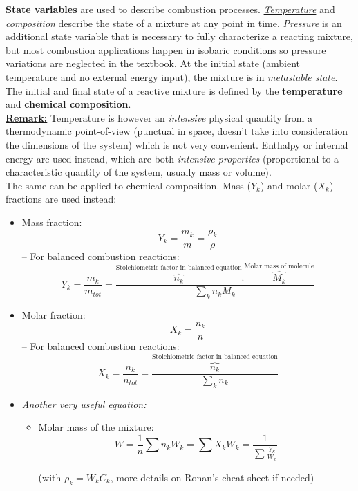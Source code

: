 \documentclass[a4paper,11pt]{article}
\begin{document}
\textbf{State variables} are used to describe combustion processes. \underline{\emph{Temperature}} and \underline{\emph{composition}} describe the state of a mixture at any point in time. \underline{\emph{Pressure}} is an additional state variable that is necessary to fully characterize a reacting mixture, but most combustion applications happen in isobaric conditions so pressure variations are neglected in the textbook.
At the initial state (ambient temperature and no external energy input), the mixture is in \emph{metastable state}. The initial and final state of a reactive mixture is defined by the \textbf{temperature} and \textbf{chemical composition}.
\vspace{4pt}
\\
\underline{\textbf{\small Remark:}} Temperature is however an \textit{intensive} physical quantity from a thermodynamic point-of-view (punctual in space, doesn't take into consideration the dimensions of the system) which is not very convenient. Enthalpy or internal energy are used instead, which are both \textit{intensive properties} (proportional to a characteristic quantity of the system, usually mass or volume).\\
The same can be applied to chemical composition. Mass ($Y_k$) and molar ($X_k$) fractions are used instead:
\begin{itemize}
    \item Mass fraction: \[Y_k = \frac{m_k}{m} = \frac{\rho_k}{\rho}\]
    -- For balanced combustion reactions:
    \[Y_k = \frac{m_k}{m_{tot}} = \frac{\overbrace{n_k}^\textrm{Stoichiometric factor in balanced equation}.\overbrace{M_k}^\textrm{Molar mass of molecule}}{\sum_{k} n_k M_k}\]
    \item Molar fraction: \[X_k = \frac{n_k}{n}\]
    -- For balanced combustion reactions:
    \[X_k = \frac{n_k}{n_{tot}} = \frac{\overbrace{n_k}^\textrm{Stoichiometric factor in balanced equation}}{\sum_{k} n_k}\]
    \item \emph{Another very useful equation:}
    \begin{itemize}
        \item Molar mass of the mixture:
            \[W = \frac{1}{n} \sum n_kW_k = \sum X_k W_k = \frac{1}{\sum \frac{Y_k}{W_k}}\]
    \begin{center}
    (with $\rho_k = W_k C_k$, more details on Ronan's cheat sheet if needed)
    \end{center}
    \end{itemize}
\end{itemize}
\end{document}
